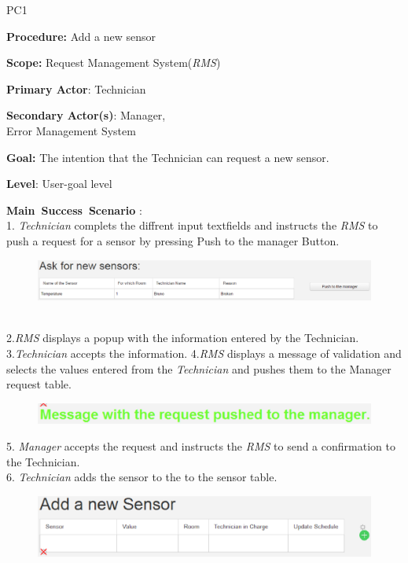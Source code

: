 \begin{lyxlist}{PC1}
\small{
\item [\textbf{Procedure:}] Add a new sensor
\item [\textbf{Scope:}] Request Management System(\emph{RMS})
\item [\textbf{Primary Actor}:] Technician
\item [\textbf{Secondary Actor(s)}:] Manager,\\
 Error Management System
\item [\textbf{Goal:}] The intention that the Technician can request a new
sensor.
\item [\textbf{Level}:] User-goal level
\item [\textbf{Main~Success~Scenario}]:\\
1. \emph{Technician} complets the diffrent input textfields and instructs the
\emph{RMS} to push a request for a sensor by pressing Push to the manager Button.
\begin{figure}
\includegraphics[width=1\textwidth]{images/AskForNewSensor.eps}
\end{figure} \\
2.\emph{RMS} displays a popup with the information entered by the Technician.
3.\emph{Technician} accepts the information.
4.\emph{RMS} displays a message of validation and selects the values entered
from the \emph{Technician} and pushes them to the Manager request table.\\
 \begin{figure}
\includegraphics[width=1\textwidth]{images/RequestAskForNewSensor.eps}
\end{figure}
5. \emph{Manager} accepts the request and instructs the \emph{RMS} to send a
confirmation to the Technician.\\
6. \emph{Technician} adds the sensor to the to the sensor table.\\
 \begin{figure}
\includegraphics[width=1\textwidth]{images/AddANewSensor.eps}
\end{figure} 

}
\end{lyxlist}
